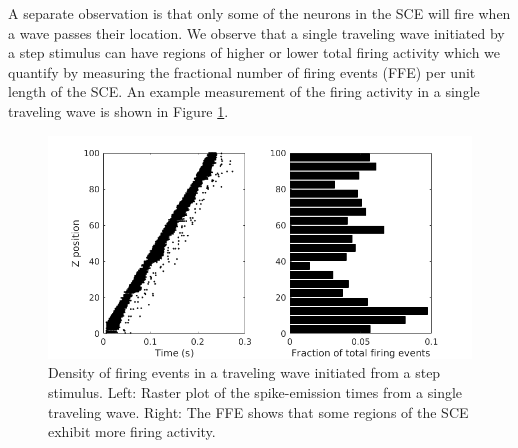 \documentclass[12pt]{article}
\begin{document}
A separate observation is that only some of the neurons in the SCE will fire when a wave passes their location.
We observe that a single traveling wave initiated by a step stimulus can have regions of higher or lower total firing activity which we quantify by measuring the fractional number of firing events (FFE) per unit length of the SCE.
An example measurement of the firing activity in a single traveling wave is shown in Figure \ref{fig:wave_density}.
\begin{figure}[!htb]
 \caption{Density of firing events in a traveling wave initiated from a step stimulus. Left: Raster plot of the spike-emission times from a single traveling wave. Right: The FFE shows that some regions of the SCE exhibit more firing activity.}
 \label{fig:wave_density}
 \centering
   \includegraphics[width=\textwidth]{fig/ImpulseWaveDensity}
\end{figure}
\end{document}
